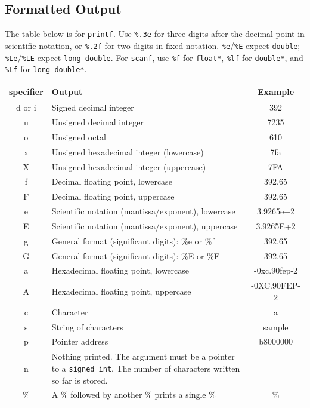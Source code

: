 \begingroup
\raggedright
\subsection{Formatted Output}
The table below is for \texttt{printf}. Use \texttt{\%.3e} for
three digits after the decimal point in scientific notation, or
\texttt{\%.2f} for two digits in fixed notation.
\texttt{\%e}/\texttt{\%E} expect \texttt{double};
\texttt{\%Le}/\texttt{\%LE} expect \texttt{long double}.
For \texttt{scanf}, use \texttt{\%f} for \texttt{float*},
\texttt{\%lf} for \texttt{double*}, and \texttt{\%Lf} for
\texttt{long double*}.

  \begin{tabular}{|c|p{6cm}|c|}
  \hline
  \textbf{specifier} & \textbf{Output} & \textbf{Example} \\ \hline

  d or i & Signed decimal integer & 392 \\ \hline
  u & Unsigned decimal integer & 7235 \\ \hline
  o & Unsigned octal & 610 \\ \hline
  x & Unsigned hexadecimal integer (lowercase) & 7fa \\ \hline
  X & Unsigned hexadecimal integer (uppercase) & 7FA \\ \hline
  f & Decimal floating point, lowercase & 392.65 \\ \hline
  F & Decimal floating point, uppercase & 392.65 \\ \hline
  e & Scientific notation (mantissa/exponent), lowercase & 3.9265e+2 \\ \hline
  E & Scientific notation (mantissa/exponent), uppercase & 3.9265E+2 \\ \hline
  g & General format (significant digits): \%e or \%f & 392.65 \\ \hline
  G & General format (significant digits): \%E or \%F & 392.65 \\ \hline
  a & Hexadecimal floating point, lowercase & -0xc.90fep-2 \\ \hline
  A & Hexadecimal floating point, uppercase & -0XC.90FEP-2 \\ \hline
  c & Character & a \\ \hline
  s & String of characters & sample \\ \hline
  p & Pointer address & b8000000 \\ \hline
  n & Nothing printed. The argument must be a pointer to a \texttt{signed int}. The number of characters written so far is stored. & \\ \hline
  \% & A \% followed by another \% prints a single \% & \% \\ \hline

  \end{tabular}
\endgroup

